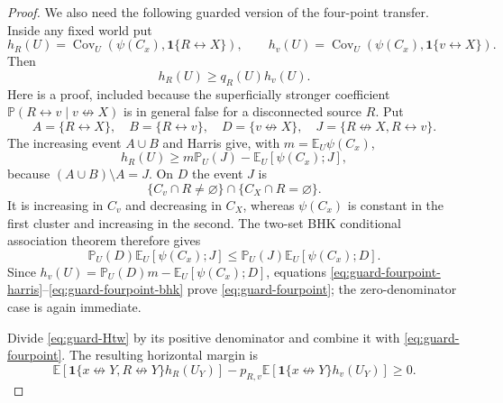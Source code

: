 \documentclass[11pt]{article}
\theoremstyle{definition}
\theoremstyle{remark}
\newcommand{\PP}{\mathbb P}
\newcommand{\EE}{\mathbb E}
\newcommand{\one}{\mathbf 1}
\newcommand{\con}{\leftrightarrow}
\newcommand{\ncon}{\not\leftrightarrow}
\begin{document}
\begin{proof}
We also need the following guarded version of the four-point transfer.
Inside any fixed world put
\[
 h_R(U)=\operatorname{Cov}_U(\psi(C_x),\one\{R\con X\}),
 \qquad h_v(U)=\operatorname{Cov}_U(\psi(C_x),\one\{v\con X\}).
\]
Then
\begin{equation}\label{eq:guard-fourpoint}
 h_R(U)\geq q_R(U)h_v(U).
\end{equation}
Here is a proof, included because the superficially stronger coefficient
$\PP(R\con v\mid v\ncon X)$ is in general false for a disconnected
source $R$.  Put
\[
 A=\{R\con X\},\quad B=\{R\con v\},\quad
 D=\{v\ncon X\},\quad J=\{R\ncon X,R\con v\}.
\]
The increasing event $A\cup B$ and Harris give, with
$m=\EE_U\psi(C_x)$,
\begin{equation}\label{eq:guard-fourpoint-harris}
 h_R(U)\geq m\PP_U(J)-\EE_U[\psi(C_x);J],
\end{equation}
because $(A\cup B)\setminus A=J$.  On $D$ the event $J$ is
\[
 \{C_v\cap R\ne\varnothing\}\cap\{C_X\cap R=\varnothing\}.
\]
It is increasing in $C_v$ and decreasing in $C_X$, whereas
$\psi(C_x)$ is constant in the first cluster and increasing in the
second.  The two-set BHK conditional association theorem therefore gives
\begin{equation}\label{eq:guard-fourpoint-bhk}
 \PP_U(D)\EE_U[\psi(C_x);J]
 \leq \PP_U(J)\EE_U[\psi(C_x);D].
\end{equation}
Since
$h_v(U)=\PP_U(D)m-\EE_U[\psi(C_x);D]$, equations
\eqref{eq:guard-fourpoint-harris}--\eqref{eq:guard-fourpoint-bhk}
prove \eqref{eq:guard-fourpoint}; the zero-denominator case is again
immediate.

Divide
\eqref{eq:guard-Htw} by its positive denominator and combine it with
\eqref{eq:guard-fourpoint}.  The resulting horizontal margin is
\begin{equation}\label{eq:guard-horizontal}
 \EE[\one\{x\ncon Y,R\ncon Y\}h_R(U_Y)]
 -p_{R,v}\EE[\one\{x\ncon Y\}h_v(U_Y)]\geq0.
\end{equation}


\end{proof}
\end{document}
